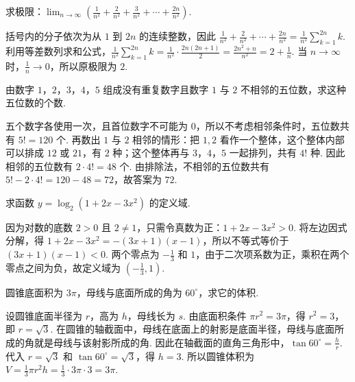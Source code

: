 \begin{problem}
求极限：\(\displaystyle\lim_{n\to\infty}\left(\frac{1}{n^2} + \frac{2}{n^2} + \frac{3}{n^2} + \cdots + \frac{2n}{n^2}\right)\).
\end{problem}

\begin{solution}
括号内的分子依次为从 \(1\) 到 \(2n\) 的连续整数，因此 \(\frac{1}{n^2}+\frac{2}{n^2}+\cdots+\frac{2n}{n^2}=\frac1{n^2}\sum_{k=1}^{2n}k\). 利用等差数列求和公式，\(\frac1{n^2}\sum_{k=1}^{2n}k=\frac1{n^2}\cdot\frac{2n(2n+1)}2=\frac{2n^2+n}{n^2}=2+\frac1n\). 当 \(n\to\infty\) 时，\(\frac1n\to0\)，所以原极限为 \(2\).
\end{solution}

\begin{problem}
由数字 \(1\)，\(2\)，\(3\)，\(4\)，\(5\) 组成没有重复数字且数字 \(1\) 与 \(2\) 不相邻的五位数，求这种五位数的个数.
\end{problem}

\begin{solution}
五个数字各使用一次，且首位数字不可能为 \(0\)，所以不考虑相邻条件时，五位数共有 \(5!=120\) 个. 再数出 \(1\) 与 \(2\) 相邻的情形：把 \(1,2\) 看作一个整体，这个整体内部可以排成 \(12\) 或 \(21\)，有 \(2\) 种；这个整体再与 \(3\)，\(4\)，\(5\) 一起排列，共有 \(4!\) 种. 因此相邻的五位数有 \(2\cdot4!=48\) 个. 由排除法，不相邻的五位数共有 \(5!-2\cdot4!=120-48=72\)，故答案为 \(72\).
\end{solution}

\begin{problem}
求函数 \(y = \log_2(1 + 2x - 3x^2)\) 的定义域.
\end{problem}

\begin{solution}
因为对数的底数 \(2>0\) 且 \(2\ne1\)，只需令真数为正：\(1+2x-3x^2>0\). 将左边因式分解，得 \(1+2x-3x^2=-(3x+1)(x-1)\)，所以不等式等价于 \((3x+1)(x-1)<0\). 两个零点为 \(-\frac13\) 和 \(1\)，由于二次项系数为正，乘积在两个零点之间为负，故定义域为 \(\left(-\frac13,1\right)\).
\end{solution}

\begin{problem}
圆锥底面积为 \(3\pi\)，母线与底面所成的角为 \(60^\circ\)，求它的体积.
\end{problem}

\begin{solution}
设圆锥底面半径为 \(r\)，高为 \(h\)，母线长为 \(s\). 由底面积条件 \(\pi r^2=3\pi\)，得 \(r^2=3\)，即 \(r=\sqrt3\). 在圆锥的轴截面中，母线在底面上的射影是底面半径，母线与底面所成的角就是母线与该射影所成的角. 因此在轴截面的直角三角形中，\(\tan60^\circ=\frac hr\). 代入 \(r=\sqrt3\) 和 \(\tan60^\circ=\sqrt3\)，得 \(h=3\). 所以圆锥体积为 \(V=\frac13\pi r^2h=\frac13\cdot3\pi\cdot3=3\pi\).
\end{solution}

